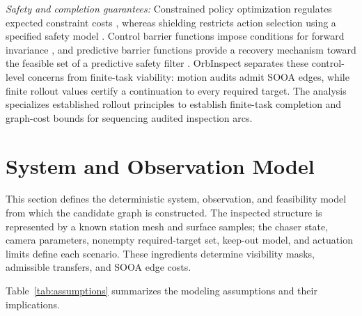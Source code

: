 \documentclass{IEEEtaes}
\begin{document}
\emph{Safety and completion guarantees:} Constrained policy optimization regulates expected constraint costs \cite{achiam2017cpo}, whereas shielding restricts action selection using a specified safety model \cite{alshiekh2018shielding}. Control barrier functions impose conditions for forward invariance \cite{ames2017barrier}, and predictive barrier functions provide a recovery mechanism toward the feasible set of a predictive safety filter \cite{wabersich2023predictive}. OrbInspect separates these control-level concerns from finite-task viability: motion audits admit SOOA edges, while finite rollout values certify a continuation to every required target. The analysis specializes established rollout principles to establish finite-task completion and graph-cost bounds for sequencing audited inspection arcs.

\section{System and Observation Model}
\label{sec:system}

This section defines the deterministic system, observation, and feasibility model from which the candidate graph is constructed. The inspected structure is represented by a known station mesh and surface samples; the chaser state, camera parameters, nonempty required-target set, keep-out model, and actuation limits define each scenario. These ingredients determine visibility masks, admissible transfers, and SOOA edge costs.

Table~\ref{tab:assumptions} summarizes the modeling assumptions and their implications.
\end{document}
